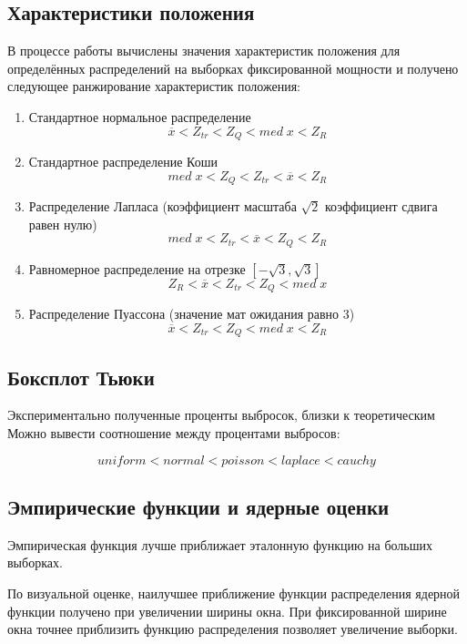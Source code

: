 \documentclass[a4]{article}
\begin{document}
\subsection{Характеристики положения}
\par В процессе работы вычислены значения характеристик положения для определённых распределений на выборках фиксированной мощности и получено следующее ранжирование характеристик положения:

\begin{enumerate}
    \item Стандартное нормальное распределение $$\overline{x} < Z_{tr} < Z_Q < med\;x < Z_R$$
    
    \item Стандартное распределение Коши $$med\;x < Z_Q < Z_{tr} < \overline{x} < Z_R$$
    
    \item Распределение Лапласа (коэффициент масштаба $\sqrt{2}$ коэффициент сдвига равен нулю) $$med\;x < Z_{tr} < \overline{x} < Z_Q < Z_R$$
    
    \item Равномерное распределение на отрезке $\left[-\sqrt{3},\sqrt{3}\right]$ $$Z_R < \overline{x} < Z_{tr} < Z_Q < med\;x$$
    
    \item Распределение Пуассона (значение мат ожидания равно $3$) $$\overline{x} < Z_{tr} < Z_Q < med\;x < Z_R$$
    
\end{enumerate}

\subsection{Боксплот Тьюки}
\par Экспериментально полученные проценты выбросок, близки к теоретическим
Можно вывести соотношение между процентами выбросов:

\begin{equation}
uniform<normal<poisson<laplace<cauchy
\end{equation}

\subsection{Эмпирические функции и ядерные оценки}
Эмпирическая функция лучше приближает эталонную функцию на больших выборках.

По визуальной оценке, наилучшее приближение функции распределения ядерной функции получено при увеличении ширины окна. При фиксированной ширине окна точнее приблизить функцию распределения позволяет увеличение выборки.
\end{document}
